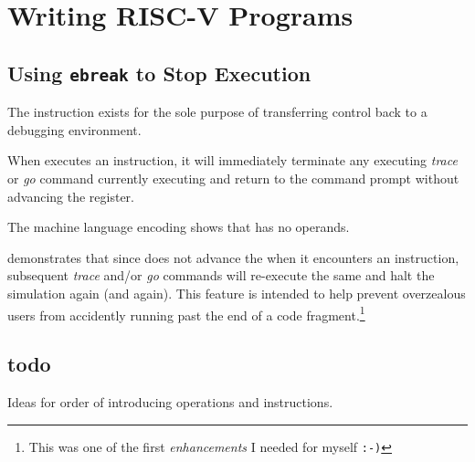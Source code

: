 \chapter{Writing RISC-V Programs}


\section{Using {\tt ebreak} to Stop \rvddt{} Execution}

The  instruction exists for the sole purpose of transferring control back 
to a debugging environment.\cite[p.~24]{rvismv1v22:2017}

When \rvddt{} executes an  instruction, it will immediately terminate any
executing {\em trace} or {\em go} command currently executing and return to the
command prompt without advancing the  register.  

The machine language encoding shows that  has no operands.


 demonstrates that since \rvddt{} does 
not advance the  when it encounters an  instruction, 
subsequent {\em trace} and/or {\em go} commands will re-execute the same  
and halt the simulation again (and again).  
This feature is intended to help prevent overzealous users from accidently 
running past the end of a code fragment.\footnote{This was one of the first {\em enhancements}
I needed for myself \tt:-)}





\section{todo}


%
Ideas for order of introducing operations and instructions.


